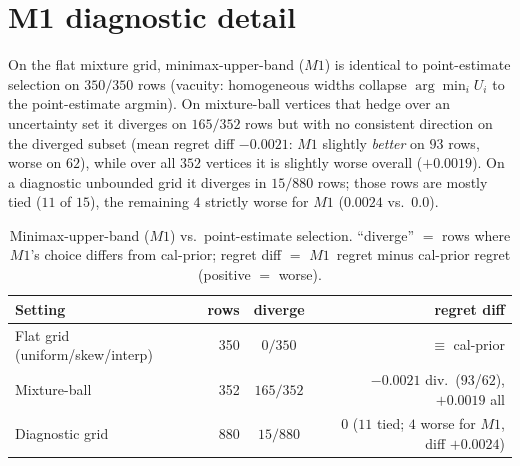 \documentclass{article}
\begin{document}



\clearpage
\appendix

\section{M1 diagnostic detail}
\label{app:m1}
On the flat mixture grid, minimax-upper-band ($M1$) is identical to point-estimate selection
on $350/350$ rows (vacuity: homogeneous widths collapse $\arg\min_i U_i$ to the point-estimate
argmin). On mixture-ball vertices that hedge over an uncertainty set it diverges on $165/352$
rows but with no consistent direction on the diverged subset (mean regret diff $-0.0021$:
$M1$ slightly \emph{better} on $93$ rows, worse on $62$), while over all $352$ vertices it is
slightly worse overall ($+0.0019$). On a diagnostic unbounded grid it diverges in $15/880$
rows; those rows are mostly tied ($11$ of $15$), the remaining $4$ strictly worse for $M1$
($0.0024$ vs.\ $0.0$).

\begin{table}[h]
\centering\small
\begin{tabular}{lrcr}
\toprule
Setting & rows & diverge & regret diff \\
\midrule
Flat grid (uniform/skew/interp) & 350 & $0/350$ & $\equiv$ cal-prior \\
Mixture-ball & 352 & $165/352$ & $-0.0021$ div.\ ($93$/$62$), $+0.0019$ all \\
Diagnostic grid & 880 & $15/880$ & $0$ ($11$ tied; $4$ worse for $M1$, diff $+0.0024$) \\
\bottomrule
\end{tabular}
\caption{Minimax-upper-band ($M1$) vs.\ point-estimate selection. ``diverge'' $=$ rows where
$M1$'s choice differs from cal-prior; regret diff $=$ $M1$~regret minus cal-prior regret
(positive $=$ worse).}
\label{tab:m1}
\end{table}
\end{document}
